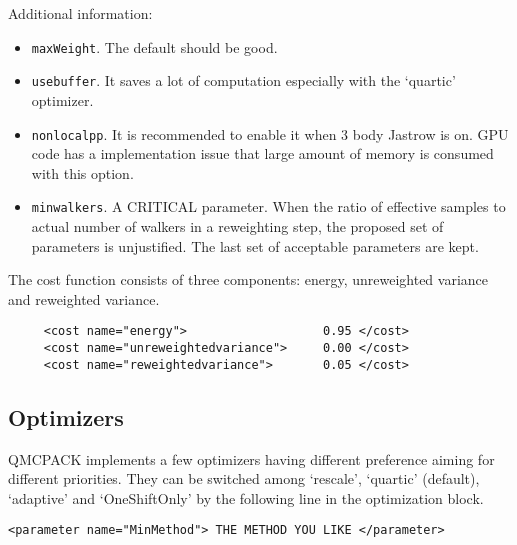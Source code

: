 Additional information:
\begin{itemize}
\item \texttt{maxWeight}. The default should be good.
\item \texttt{usebuffer}. It saves a lot of computation especially with the `quartic' optimizer.
\item \texttt{nonlocalpp}. It is recommended to enable it when 3 body Jastrow is on. GPU code has a implementation issue that large amount of memory is consumed with this option.
\item \texttt{minwalkers}. A CRITICAL parameter. When the ratio of effective samples to actual number of walkers in a reweighting step, 
the proposed set of parameters is unjustified. The last set of acceptable parameters are kept.
\end{itemize}

The cost function consists of three components: energy, unreweighted variance and reweighted variance.
\begin{lstlisting}
     <cost name="energy">                   0.95 </cost>
     <cost name="unreweightedvariance">     0.00 </cost>
     <cost name="reweightedvariance">       0.05 </cost>
\end{lstlisting}

\subsection{Optimizers}
QMCPACK implements a few optimizers having different preference aiming for different priorities.
They can be switched among `rescale', `quartic' (default), `adaptive' and `OneShiftOnly' by the following line in the optimization block.
\begin{lstlisting}
<parameter name="MinMethod"> THE METHOD YOU LIKE </parameter>
\end{lstlisting}

